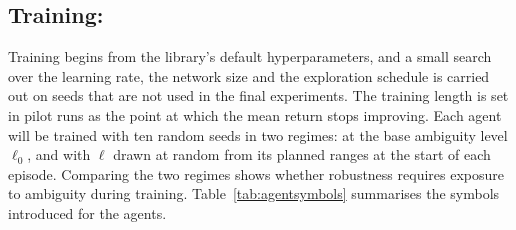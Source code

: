 \subsection{Training:}

Training begins from the library's default hyperparameters, and a small search over the learning rate, the network size and the exploration schedule is carried out on seeds that are not used in the final experiments. The training length is set in pilot runs as the point at which the mean return stops improving. Each agent will be trained with ten random seeds in two regimes: at the base ambiguity level $\ell_0$, and with $\ell$ drawn at random from its planned ranges at the start of each episode. Comparing the two regimes shows whether robustness requires exposure to ambiguity during training. Table~\ref{tab:agentsymbols} summarises the symbols introduced for the agents.

